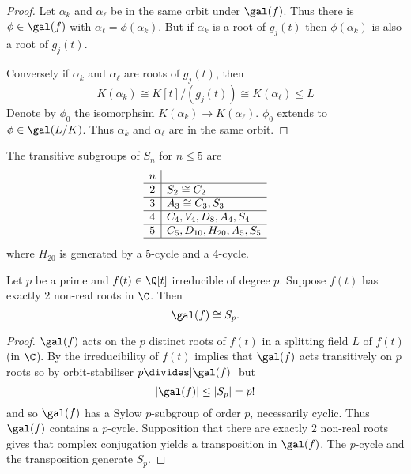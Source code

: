 \documentclass[a4paper]{article}
\begin{document}
\begin{proof}
  Let \(\alpha_k\) and \(\alpha_\ell\) be in the same orbit under \(\gal(f)\). Thus there is \(\phi \in \gal(f)\) with \(\alpha_\ell = \phi(\alpha_k)\). But if \(\alpha_k\) is a root of \(g_j(t)\) then \(\phi(\alpha_k)\) is also a root of \(g_j(t)\).

  Conversely if \(\alpha_k\) and \(\alpha_\ell\) are roots of \(g_j(t)\), then
  \[
    K(\alpha_k) \cong K[t]/(g_j(t)) \cong K(\alpha_\ell) \leq L
  \]
  Denote by \(\phi_0\) the isomorphsim \(K(\alpha_k) \to K(\alpha_\ell)\). \(\phi_0\) extends to \(\phi \in \gal(L/K)\). Thus \(\alpha_k\) and \(\alpha_\ell\) are in the same orbit.
\end{proof}

\begin{lemma}
  \label{lem:transitive subgroups of Sn}
  The transitive subgroups of \(S_n\) for \(n \leq 5\) are
  \[
  \begin{array}[h]{c|l}
    n & \\ \hline
    2 & S_2 \cong C_2 \\ \hline
    3 & A_3 \cong C_3, S_3 \\ \hline
    4 & C_4, V_4, D_8, A_4, S_4 \\ \hline
    5 & C_5, D_{10}, H_{20}, A_5, S_5 \\ \hline
  \end{array}
  \]
  where \(H_{20}\) is generated by a \(5\)-cycle and a \(4\)-cycle.
\end{lemma}

\begin{theorem}
  \label{thm:galois group Sp}
  Let \(p\) be a prime and \(f(t) \in \Q[t]\) irreducible of degree \(p\). Suppose \(f(t)\) has exactly \(2\) non-real roots in \(\C\). Then
  \[
    \gal(f) \cong S_p.
  \]
\end{theorem}

\begin{proof}
  \(\gal(f)\) acts on the \(p\) distinct roots of \(f(t)\) in a splitting field \(L\) of \(f(t)\) (in \(\C\)). By  the irreducibility of \(f(t)\) implies that \(\gal(f)\) acts transitively on \(p\) roots so by orbit-stabiliser \(p \divides |\gal(f)|\) but
  \[
    |\gal(f)| \leq |S_p| = p!
  \]
  and so \(\gal(f)\) has a Sylow \(p\)-subgroup of order \(p\), necessarily cyclic. Thus \(\gal(f)\) contains a \(p\)-cycle. Supposition that there are exactly \(2\) non-real roots gives that complex conjugation yields a transposition in \(\gal(f)\). The \(p\)-cycle and the transposition generate \(S_p\).
\end{proof}
\end{document}
